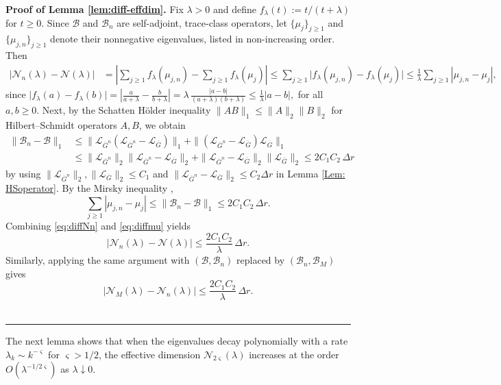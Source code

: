 \documentclass[12pt]{article}
\def\Gbar{ {\overline{G}} }
\newenvironment{proof}[1][Proof]{\noindent\textbf{#1.} }{\ \rule{0.5em}{0.5em}}
\numberwithin{equation}{section}
\numberwithin{theorem}{section}
\begin{document}
\begin{proof}[Proof of Lemma \ref{lem:diff-effdim}]
Fix $\lambda>0$ and define $f_\lambda(t) := t/(t+\lambda)$ for $t\ge0$. Since $\mathcal{B}$ and $\mathcal{B}_n$ are self-adjoint, trace-class operators, let $\{\mu_j\}_{j\ge1}$ and $\{\mu_{j,n}\}_{j\ge1}$ denote their nonnegative eigenvalues, listed in non-increasing order. Then
\begin{equation}
\label{eq:diffNn}
\begin{aligned}
|\mathcal{N}_n(\lambda)-\mathcal{N}(\lambda)|
&= \left|\sum_{j\ge1} f_\lambda(\mu_{j,n}) - \sum_{j\ge1} f_\lambda(\mu_j)\right| \le \sum_{j\ge1}\bigl|f_\lambda(\mu_{j,n}) - f_\lambda(\mu_j)\bigr|
 \le \frac{1}{\lambda}\sum_{j\ge1}|\mu_{j,n}-\mu_j|,
\end{aligned}
\end{equation}
since
$
\bigl|f_\lambda(a)-f_\lambda(b)\bigr|
= \left|\frac{a}{a+\lambda} - \frac{b}{b+\lambda}\right|
= \lambda\,\frac{|a-b|}{(a+\lambda)(b+\lambda)}
\le \frac{1}{\lambda}|a-b|,
$
for all $a,b\ge0$. Next, by the Schatten Hölder inequality $\|AB\|_1 \le \|A\|_2\|B\|_2$ for Hilbert--Schmidt operators $A,B$, we obtain
$$
\begin{aligned}
\|\mathcal{B}_n-\mathcal{B}\|_1
&\le \|\mathcal{L}_{\Gbar^n}(\mathcal{L}_{\Gbar^n}-\mathcal{L}_{\Gbar})\|_1
 + \|(\mathcal{L}_{\Gbar^n}-\mathcal{L}_{\Gbar})\mathcal{L}_{\Gbar}\|_1 \\
&\le \|\mathcal{L}_{\Gbar^n}\|_2\|\mathcal{L}_{\Gbar^n}-\mathcal{L}_{\Gbar}\|_2
 + \|\mathcal{L}_{\Gbar^n}-\mathcal{L}_{\Gbar}\|_2\|\mathcal{L}_{\Gbar}\|_2 \le 2 C_1 C_2\,\Delta r
\end{aligned}
$$
by using $\|\mathcal{L}_{\Gbar^n}\|_2,\|\mathcal{L}_{\Gbar}\|_2\le C_1$ and $\|\mathcal{L}_{\Gbar^n}-\mathcal{L}_{\Gbar}\|_2 \le C_2\Delta r$ in Lemma \ref{Lem: HSoperator}. By the Mirsky inequality \cite{foucart2018concave},
\begin{equation}
\label{eq:diffmu}
\sum_{j\ge1}|\mu_{j,n}-\mu_j|
\le \|\mathcal B_n-\mathcal B\|_1
\le 2 C_1 C_2\,\Delta r.
\end{equation}
Combining \eqref{eq:diffNn} and \eqref{eq:diffmu} yields
$$
|\mathcal N_n(\lambda)-\mathcal N(\lambda)|
\le \frac{2 C_1 C_2}{\lambda}\,\Delta r.
$$
Similarly, applying the same argument with $(\mathcal B,\mathcal B_n)$ replaced by $(\mathcal B_n,\mathcal B_M)$ gives
$$
|\mathcal{N}_M(\lambda)-\mathcal{N}_n(\lambda)|
\le \frac{2 C_1 C_2}{\lambda}\,\Delta r.
$$
\end{proof}

The next lemma shows that when the eigenvalues decay polynomially with a rate $\lambda_k\sim k^{-\varsigma}$ for $\varsigma>1/2$, the effective dimension $\mathcal{N}_{2\varsigma}(\lambda)$ increases at the order $O(\lambda^{-1/2\varsigma})$ as $\lambda\downarrow 0$. 
\end{document}
